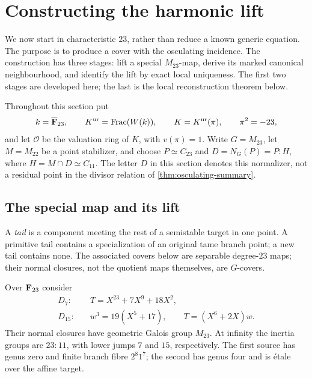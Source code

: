 \section{Constructing the harmonic lift}
\label{sec:harmonic-construction}

We now start in characteristic $23$, rather than reduce a known generic
equation.  The purpose is to produce a cover with the osculating
incidence.  The construction has three stages: lift a special $M_{23}$-map,
derive its marked canonical neighbourhood, and identify the lift by
exact local uniqueness.  The first two stages are developed here; the
last is the local reconstruction theorem below.

Throughout this section put
\[
 k=\overline{\mathbf F}_{23},\qquad K^{\mathrm{ur}}=\operatorname{Frac}(W(k)),
 \qquad K=K^{\mathrm{ur}}(\pi),\qquad \pi^2=-23,
\]
and let $\mathcal O$ be the valuation ring of $K$, with $v(\pi)=1$.
Write $G=M_{23}$, let $M=M_{22}$ be a point stabilizer, and choose
$P\simeq C_{23}$ and $D=N_G(P)=P{:}H$, where $H=M\cap D\simeq C_{11}$.
The letter $D$ in this section denotes this normalizer, not a residual
point in the divisor relation of \cref{thm:osculating-summary}.

\subsection{The special map and its lift}

A \emph{tail} is a component meeting the rest of a semistable target
in one point.  A primitive tail contains a specialization of an
original tame branch point; a new tail contains none.  The associated
covers below are separable degree-$23$ maps; their normal closures,
not the quotient maps themselves, are $G$-covers.

\begin{computation}
\label{comp:harmonic-tail-groups}
Over $\mathbf F_{23}$ consider
\begin{equation}
 \begin{aligned}
  D_7:&\quad T=X^{23}+7X^9+18X^2,\\
  D_{15}:&\quad w^3=19(X^5+17),\qquad T=(X^6+2X)w.
 \end{aligned}
\label{eq:harmonic-tail-inputs}
\end{equation}
Their normal closures have geometric Galois group $M_{23}$.
At infinity the inertia groups are $23{:}11$, with lower jumps $7$
and $15$, respectively.  The first source has genus zero and finite
branch fibre $2^8 1^7$; the second has genus four and is \'etale over
the affine target.
\end{computation}

